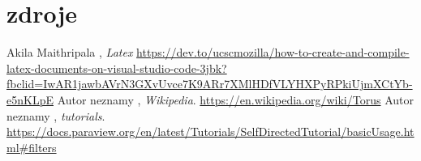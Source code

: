 \documentclass[11pt, a4paper]{article}
\begin{document}
\section{zdroje}
\begin{thebibliography}{3}
    Akila Maithripala , \textit{Latex}
    \url{https://dev.to/ucscmozilla/how-to-create-and-compile-latex-documents-on-visual-studio-code-3jbk?fbclid=IwAR1jawbAVrN3GXvUvce7K9ARr7XMlHDfVLYHXPyRPkiUjmXCtYb-e5nKLpE}
    Autor neznamy , \textit{Wikipedia}.
    \url{https://en.wikipedia.org/wiki/Torus}
    Autor neznamy , \textit{tutorials}.
    \url{https://docs.paraview.org/en/latest/Tutorials/SelfDirectedTutorial/basicUsage.html#filters}

\end{thebibliography}
\end{document}
